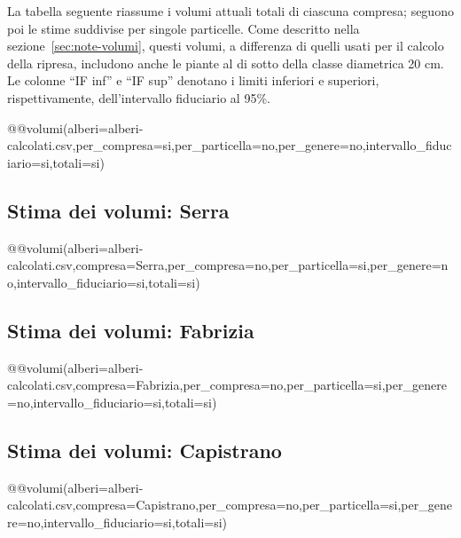 La tabella seguente riassume i volumi attuali totali di ciascuna compresa;
seguono poi le stime suddivise per singole particelle. Come descritto nella
sezione~\ref{sec:note-volumi}, questi volumi, a differenza di quelli usati per
il calcolo della ripresa, includono anche le piante al di sotto della classe
diametrica 20 cm. Le colonne ``IF inf'' e ``IF sup'' denotano i limiti inferiori
e superiori, rispettivamente, dell'intervallo fiduciario al 95\%.

@@volumi(alberi=alberi-calcolati.csv,per_compresa=si,per_particella=no,per_genere=no,intervallo_fiduciario=si,totali=si)

\subsection*{Stima dei volumi: Serra}
@@volumi(alberi=alberi-calcolati.csv,compresa=Serra,per_compresa=no,per_particella=si,per_genere=no,intervallo_fiduciario=si,totali=si)
\clearpage

\subsection*{Stima dei volumi: Fabrizia}
@@volumi(alberi=alberi-calcolati.csv,compresa=Fabrizia,per_compresa=no,per_particella=si,per_genere=no,intervallo_fiduciario=si,totali=si)

\subsection*{Stima dei volumi: Capistrano}
@@volumi(alberi=alberi-calcolati.csv,compresa=Capistrano,per_compresa=no,per_particella=si,per_genere=no,intervallo_fiduciario=si,totali=si)

\clearpage

